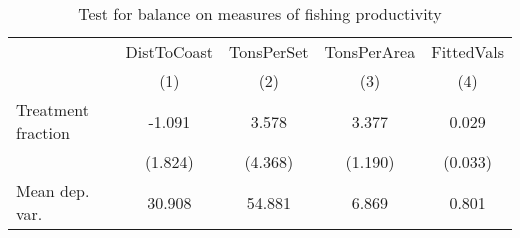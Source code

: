 \begin{table}[tb]
\centering
\caption{Test for balance on measures of fishing productivity} 
\label{balance}
\begin{tabular}{lcccc}
   \toprule   & DistToCoast & TonsPerSet & TonsPerArea & FittedVals \\ 
   & (1) & (2) & (3) & (4) \\ 
   \midrule Treatment fraction & -1.091 & 3.578 & 3.377 & 0.029 \\ 
   & (1.824) & (4.368) & (1.190) & (0.033) \\ 
   \midrule Mean dep. var. & 30.908 & 54.881 & 6.869 & 0.801 \\ 
   \bottomrule  \end{tabular}
\end{table}
